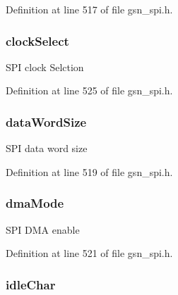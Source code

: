 Definition at line 517 of file gsn\_\-spi.h.

\hypertarget{a00231_af879184c3660e99b8402d538c035fbc5}{
\subsubsection[{clockSelect}]{ {\bf clockSelect}}}
\label{a00231_af879184c3660e99b8402d538c035fbc5}
SPI clock Selction 

Definition at line 525 of file gsn\_\-spi.h.

\hypertarget{a00231_a3998333a3ec939733a315371ea525299}{
\subsubsection[{dataWordSize}]{ {\bf dataWordSize}}}
\label{a00231_a3998333a3ec939733a315371ea525299}
SPI data word size 

Definition at line 519 of file gsn\_\-spi.h.

\hypertarget{a00231_a8745e343cad523631d63304871d0bdf3}{
\subsubsection[{dmaMode}]{ {\bf dmaMode}}}
\label{a00231_a8745e343cad523631d63304871d0bdf3}
SPI DMA enable 

Definition at line 521 of file gsn\_\-spi.h.

\hypertarget{a00231_abf7d1a3fd39bc4650832af3d1f22a59d}{
\subsubsection[{idleChar}]{ {\bf idleChar}}}
\label{a00231_abf7d1a3fd39bc4650832af3d1f22a59d}


